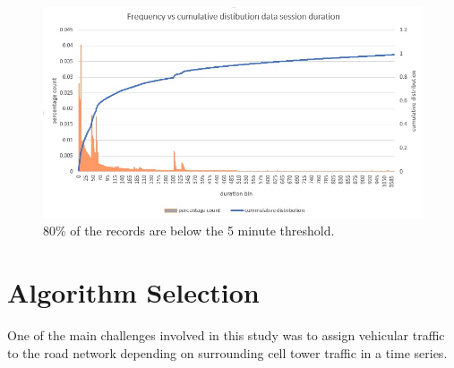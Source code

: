 \documentclass[12pt, a4paper]{report}
\theoremstyle{definition}
\theoremstyle{definition}%
\theoremstyle{definition}%
\theoremstyle{definition}%
\theoremstyle{definition}%
\theoremstyle{definition}%
\begin{document}
 
 \begin{figure}
 	\includegraphics[scale=0.75]{data_session_duration.jpg}
 	\centering
 	\caption[Data session duration cummultive distribution]{80\% of the records are below the 5 minute threshold.}
 	\label{fig:data_session_duration}
 \end{figure}
 


\section{Algorithm Selection} \label{section:methodology:algorithm_selection}

One of the main challenges involved in this study was to assign vehicular traffic to the road network depending on surrounding cell tower traffic in a time series.
\end{document}
